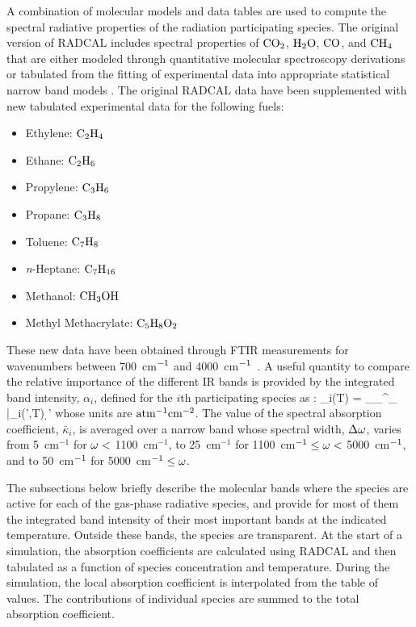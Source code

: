 A combination of molecular models and data tables are used to compute the spectral radiative properties of the radiation participating species. The original version of RADCAL includes spectral properties of $\rm CO_2$, $\rm H_2O$, $\rm CO$, and $\rm CH_4$ that are either modeled through quantitative molecular spectroscopy derivations or tabulated from the fitting of experimental data into appropriate statistical narrow band models \cite{RadCal}. The original RADCAL data have been supplemented with new tabulated experimental data for the following fuels:
\begin{itemize}
  \item Ethylene:  $\rm C_2H_4$
  \item Ethane:    $\rm C_2H_6$
  \item Propylene: $\rm C_3H_6$
  \item Propane:   $\rm C_3H_8$
  \item Toluene:   $\rm C_7H_8$
  \item \textit{n}-Heptane: $\rm C_7H_{16}$
  \item Methanol:  $\rm CH_3OH$
  \item Methyl Methacrylate: $\rm C_5H_8O_2$
\end{itemize}
These new data have been obtained through FTIR measurements for wavenumbers between 700~cm$\rm ^{-1}$ and 4000~cm$\rm ^{-1}$~\cite{Wakatsuki:2005}. A useful quantity to compare the relative importance of the different IR bands is provided by the integrated band intensity, $\alpha_i$, defined for the $i$th participating species as \cite{Matheson:1932}:
\be
  \alpha_i(T) = \displaystyle\int_{\om_{\min}}^{\om_{\max}} \bar{\kappa}_i(\om',T) \; \d \om'
\ee
whose units are $\rm {atm^{-1} cm^{-2}}$. The value of the spectral absorption coefficient, $\bar{\kappa}_i$, is averaged over a narrow band whose spectral width, $\Delta \omega$, varies from 5~cm$^{-1}$ for $\omega < $ 1100~cm$^{-1}$, to 25~cm$^{-1}$ for 1100~cm$^{-1} \leq \omega < $ 5000~cm$^{\rm -1}$, and to 50~cm$^{\rm -1}$ for 5000~cm$^{\rm -1}\leq \omega$.

The subsections below briefly describe the molecular bands where the species are active for each of the gas-phase radiative species, and provide for most of them the integrated band intensity of their most important bands at the indicated temperature. Outside these bands, the species are transparent. At the start of a simulation, the absorption coefficients are calculated using RADCAL and then tabulated as a function of species concentration and temperature. During the simulation, the local absorption coefficient is interpolated from the table of values. The contributions of individual species are summed to the total absorption coefficient.



